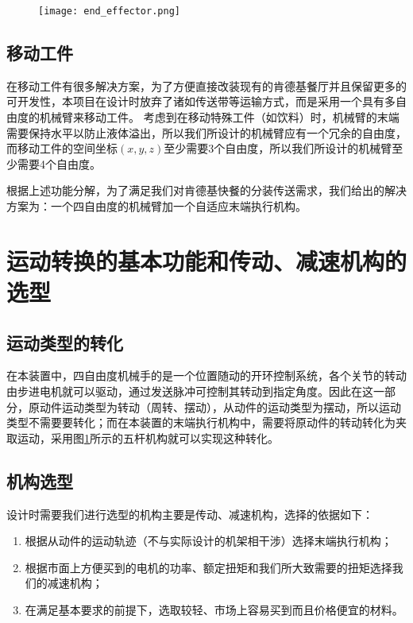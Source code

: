 \begin{figure}[!htp]
    \centering
    \texttt{[image: end\_effector.png]}
    \label{fig:endeffector}
\end{figure}
\subsection{移动工件}

在移动工件有很多解决方案，为了方便直接改装现有的肯德基餐厅并且保留更多的可开发性，本项目在设计时放弃了诸如传送带等运输方式，而是采用一个具有多自由度的机械臂来移动工件。
考虑到在移动特殊工件（如饮料）时，机械臂的末端需要保持水平以防止液体溢出，所以我们所设计的机械臂应有一个冗余的自由度，而移动工件的空间坐标$(x, y, z)$至少需要3个自由度，所以我们所设计的机械臂至少需要4个自由度。

\hfill

根据上述功能分解，为了满足我们对肯德基快餐的分装传送需求，我们给出的解决方案为：一个四自由度的机械臂加一个自适应末端执行机构。

\section{运动转换的基本功能和传动、减速机构的选型}

\subsection{运动类型的转化}

在本装置中，四自由度机械手的是一个位置随动的开环控制系统，各个关节的转动由步进电机就可以驱动，通过发送脉冲可控制其转动到指定角度。因此在这一部分，原动件运动类型为转动（周转、摆动），从动件的运动类型为摆动，所以运动类型不需要要转化；而在本装置的末端执行机构中，需要将原动件的转动转化为夹取运动，采用图\ref{fig:endeffector}所示的五杆机构就可以实现这种转化。

\subsection{机构选型}

设计时需要我们进行选型的机构主要是传动、减速机构，选择的依据如下：
\begin{enumerate}
    \item   根据从动件的运动轨迹（不与实际设计的机架相干涉）选择末端执行机构；
    \item   根据市面上方便买到的电机的功率、额定扭矩和我们所大致需要的扭矩选择我们的减速机构；
    \item   在满足基本要求的前提下，选取较轻、市场上容易买到而且价格便宜的材料。
\end{enumerate}


